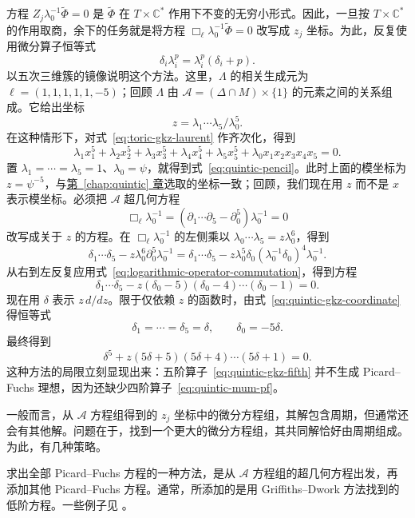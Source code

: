 方程 $Z_j\lambda_0^{-1}\widetilde\Phi=0$ 是 $\widetilde\Phi$ 在 $T\times\mathbb C^*$ 作用下不变的无穷小形式。因此，一旦按 $T\times\mathbb C^*$ 的作用取商，余下的任务就是将方程
$\Box_\ell\lambda_0^{-1}\widetilde\Phi=0$ 改写成 $z_j$ 坐标。为此，反复使用微分算子恒等式
\begin{equation}\label{eq:logarithmic-operator-commutation}
\delta_i\lambda_i^p=\lambda_i^p(\delta_i+p).
\end{equation}
以五次三维簇的镜像说明这个方法。这里，$\Lambda$ 的相关生成元为 $\ell=(1,1,1,1,1,-5)$；回顾 $\Lambda$ 由
$\mathcal A=(\Delta\cap M)\times\{1\}$ 的元素之间的关系组成。它给出坐标
\begin{equation}\label{eq:quintic-gkz-coordinate}
z=\lambda_1\cdots\lambda_5/\lambda_0^5.
\end{equation}
在这种情形下，对式~\eqref{eq:toric-gkz-laurent} 作齐次化，得到
\[
\lambda_1x_1^5+\lambda_2x_2^5+\lambda_3x_3^5+\lambda_4x_4^5+\lambda_5x_5^5
+\lambda_0x_1x_2x_3x_4x_5=0.
\]
置 $\lambda_1=\cdots=\lambda_5=1$、$\lambda_0=\psi$，就得到式~\eqref{eq:quintic-pencil}。此时上面的模坐标为 $z=\psi^{-5}$，与\hyperref[chap:quintic]{第~\ref*{chap:quintic} 章}选取的坐标一致；回顾，我们现在用 $z$ 而不是 $x$ 表示模坐标。必须把 $\mathcal A$ 超几何方程
\[
\Box_\ell\lambda_0^{-1}=(\partial_1\cdots\partial_5-\partial_0^5)\lambda_0^{-1}=0
\]
改写成关于 $z$ 的方程。在 $\Box_\ell\lambda_0^{-1}$ 的左侧乘以
$\lambda_0\cdots\lambda_5=z\lambda_0^6$，得到
\[
\delta_1\cdots\delta_5-z\lambda_0^6\partial_0^5\lambda_0^{-1}
=\delta_1\cdots\delta_5-z\lambda_0^5\delta_0(\lambda_0^{-1}\delta_0)^4\lambda_0^{-1}.
\]
从右到左反复应用式~\eqref{eq:logarithmic-operator-commutation}，得到方程
\[
\delta_1\cdots\delta_5-z(\delta_0-5)(\delta_0-4)\cdots(\delta_0-1)=0.
\]
现在用 $\delta$ 表示 $z\,d/dz$。限于仅依赖 $z$ 的函数时，由式~\eqref{eq:quintic-gkz-coordinate} 得恒等式
\[
\delta_1=\cdots=\delta_5=\delta,\qquad\delta_0=-5\delta.
\]
最终得到
\begin{equation}\label{eq:quintic-gkz-fifth}
\delta^5+z(5\delta+5)(5\delta+4)\cdots(5\delta+1)=0.
\end{equation}
这种方法的局限立刻显现出来：五阶算子~\eqref{eq:quintic-gkz-fifth} 并不生成 Picard--Fuchs 理想，因为还缺少四阶算子~\eqref{eq:quintic-mum-pf}。

一般而言，从 $\mathcal A$ 方程组得到的 $z_j$ 坐标中的微分方程组，其解包含周期，但通常还会有其他解。问题在于，找到一个更大的微分方程组，其共同解恰好由周期组成。为此，有几种策略。

求出全部 Picard--Fuchs 方程的一种方法，是从 $\mathcal A$ 方程组的超几何方程出发，再添加其他 Picard--Fuchs 方程。通常，所添加的是用 Griffiths--Dwork 方法找到的低阶方程。一些例子见 。

